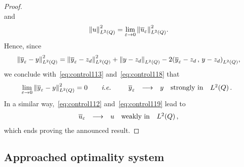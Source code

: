 \begin{proof}
\begin{equation}
    \end{equation}
    and
    \begin{equation}\label{eq:control119}
        {\left\|{u }\right\|}_{L^{2}\left({Q}\right)}^{2} = \lim_{\varepsilon\to 0}{\left\|{{\overline{u}}_{\varepsilon} }\right\|}_{L^{2}\left({Q}\right)}^{2}.
    \end{equation}
    Hence, since
    \begin{equation*}
        \normecq{\bareps{y} - y} = \normecq{\bareps{y} - z_{d}} + \normeq{y
        - z_{d}} -2\scalaireq{%
            \bareps{y} - z_{d}
        }{%
            y - z_{d}
        },
    \end{equation*}
    we conclude with~\eqref{eq:control113} and~\eqref{eq:control118} that
    \begin{equation*}\label{eq:control120}
        \lim_{\varepsilon\to 0}{\left\|{{\overline{y}}_{\varepsilon} - y }\right\|}_{L^{2}\left({Q}\right)}^{2} = 0\qquad\textit{i.e.}\qquad
        \begin{array}{rclll}
            {\overline{y}}_{\varepsilon} & \longrightarrow & y & \text{strongly in} &
            L^{2}\!\left({Q}\right).
        \end{array}
    \end{equation*}
    In a similar way,~\eqref{eq:control112} and~\eqref{eq:control119} lead
    to
    \begin{equation*}
        \begin{array}{rclll}
            {\overline{u}}_{\varepsilon} & \longrightarrow & u & \text{weakly in} & L^{2}\!\left({Q}\right),
        \end{array}
    \end{equation*}
    which ends proving the announced result.
\end{proof}

\subsection{Approached optimality system}\label{sec:approachedso}

